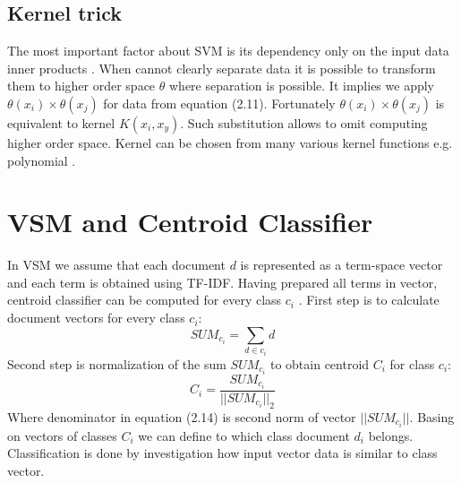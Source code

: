 \subsection{Kernel trick}
The most important factor about SVM is its dependency only on the input data inner products \cite{6}. When cannot clearly separate data it is possible to transform them to higher order space $\theta$ where separation is possible. It implies we apply $\theta(x_i) \times \theta(x_j)$ for data from equation (2.11). Fortunately $\theta(x_i) \times \theta(x_j)$ is equivalent to kernel $K(x_i,x_y)$. Such substitution allows to omit computing higher order space. Kernel can be chosen from many various kernel functions e.g. polynomial \cite{svm_wiki}.

\section{VSM and Centroid Classifier}
In VSM we assume that each document $d$ is represented as a term-space vector and each term is obtained using TF-IDF. Having prepared all terms in vector, centroid classifier can be computed for every class $c_i$ \cite{8}.
\newline First step is to calculate document vectors for every class $c_i$:
\begin{equation}
SUM_{c_i} = \sum_{d\in c_i}d
\end{equation}
\newline Second step is normalization of the sum $SUM_{c_i}$ to obtain centroid $C_i$ for class $c_i$:
\begin{equation}
C_i = \frac{SUM_{c_i}}{||SUM_{c_i}||_2}
\end{equation}
Where denominator in equation (2.14) is second norm of vector $||SUM_{c_i}||$. Basing on vectors of classes $C_i$ we can define to which class document $d_i$ belongs. Classification is done by investigation how input vector data is similar to class vector. 

